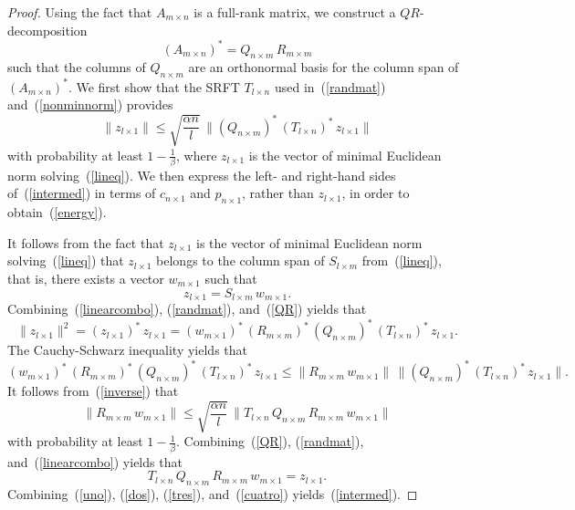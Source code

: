 \documentclass[letterpaper,12pt]{article}
\begin{document}
\begin{proof}
Using the fact that $A_{m \times n}$ is a full-rank matrix,
we construct a $QR$-decomposition
\begin{equation}
\label{QR}
(A_{m \times n})^* = Q_{n \times m} \, R_{m \times m}
\end{equation}
such that the columns of $Q_{n \times m}$ are an orthonormal basis
for the column span of $(A_{m \times n})^*$.
We first show that the SRFT $T_{l \times n}$ used
in~(\ref{randmat}) and~(\ref{nonminnorm}) provides
\begin{equation}
\label{intermed}
\| z_{l \times 1} \|
\le \sqrt{\frac{\alpha n}{l}}
 \, \| (Q_{n \times m})^* \, (T_{l \times n})^* \, z_{l \times 1} \|
\end{equation}
with probability at least $1-\frac{1}{\beta}$,
where $z_{l \times 1}$ is the vector of minimal Euclidean norm
solving~(\ref{lineq}).
We then express the left- and right-hand sides of~(\ref{intermed})
in terms of $c_{n \times 1}$ and $p_{n \times 1}$,
rather than $z_{l \times 1}$, in order to obtain~(\ref{energy}).

It follows from the fact that $z_{l \times 1}$ is the vector
of minimal Euclidean norm solving~(\ref{lineq})
that $z_{l \times 1}$ belongs to the column span
of $S_{l \times m}$ from~(\ref{lineq}), that is,
there exists a vector $w_{m \times 1}$ such that
\begin{equation}
\label{linearcombo}
z_{l \times 1} = S_{l \times m} \, w_{m \times 1}.
\end{equation}
Combining~(\ref{linearcombo}), (\ref{randmat}), and~(\ref{QR}) yields that
\begin{equation}
\label{uno}
\| z_{l \times 1} \|^2 = (z_{l \times 1})^* \, z_{l \times 1}
= (w_{m \times 1})^* \, (R_{m \times m})^* \, (Q_{n \times m})^* \,
  (T_{l \times n})^* \, z_{l \times 1}.
\end{equation}
The Cauchy-Schwarz inequality yields that
\begin{equation}
\label{dos}
(w_{m \times 1})^* \, (R_{m \times m})^* \, (Q_{n \times m})^* \,
(T_{l \times n})^* \, z_{l \times 1}
\le \| R_{m \times m} \, w_{m \times 1} \|
\, \| (Q_{n \times m})^* \, (T_{l \times n})^* \, z_{l \times 1} \|.
\end{equation}
It follows from~(\ref{inverse}) that
\begin{equation}
\label{tres}
\| R_{m \times m} \, w_{m \times 1} \|
\le \sqrt{\frac{\alpha n}{l}} \,
\| T_{l \times n} \, Q_{n \times m} \, R_{m \times m} \, w_{m \times 1} \|
\end{equation}
with probability at least $1-\frac{1}{\beta}$.
Combining~(\ref{QR}), (\ref{randmat}), and~(\ref{linearcombo}) yields that
\begin{equation}
\label{cuatro}
T_{l \times n} \, Q_{n \times m} \, R_{m \times m} \, w_{m \times 1}
= z_{l \times 1}.
\end{equation}
Combining~(\ref{uno}), (\ref{dos}), (\ref{tres}), and~(\ref{cuatro})
yields~(\ref{intermed}).


\end{proof}
\end{document}
